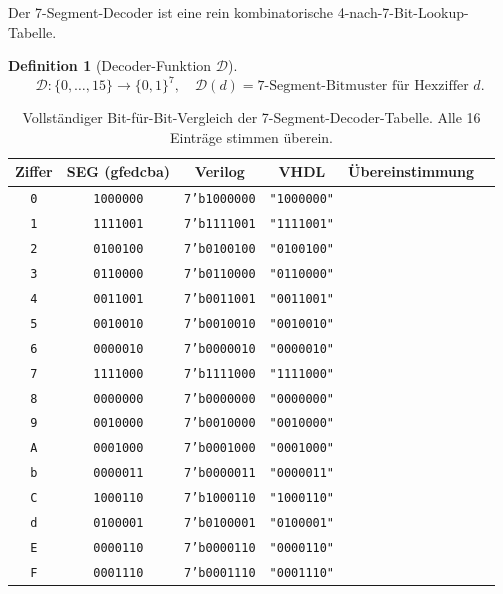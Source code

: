 ﻿\documentclass[12pt,a4paper]{report}
\newtheorem{definition}{Definition}[section]
\begin{document}
Der 7-Segment-Decoder ist eine rein kombinatorische 4-nach-7-Bit-Lookup-Tabelle.

\begin{definition}[Decoder-Funktion $\mathcal{D}$]
	\[
	\mathcal{D} : \{0,\ldots,15\} \to \{0,1\}^7, \quad
	\mathcal{D}(d) = \text{7-Segment-Bitmuster für Hexziffer } d.
	\]
\end{definition}

\begin{table}[H]
	\centering
	\small
	\begin{tabular}{|c|c|c|c|c|c|}
		\hline
		\textbf{Ziffer} & \textbf{SEG (gfedcba)} & \textbf{Verilog} & \textbf{VHDL} & \textbf{Übereinstimmung}\\
		\hline
		\texttt{0} & \texttt{1000000} & \texttt{7'b1000000} & \texttt{"1000000"} & \checkmark \\
		\texttt{1} & \texttt{1111001} & \texttt{7'b1111001} & \texttt{"1111001"} & \checkmark \\
		\texttt{2} & \texttt{0100100} & \texttt{7'b0100100} & \texttt{"0100100"} & \checkmark \\
		\texttt{3} & \texttt{0110000} & \texttt{7'b0110000} & \texttt{"0110000"} & \checkmark \\
		\texttt{4} & \texttt{0011001} & \texttt{7'b0011001} & \texttt{"0011001"} & \checkmark \\
		\texttt{5} & \texttt{0010010} & \texttt{7'b0010010} & \texttt{"0010010"} & \checkmark \\
		\texttt{6} & \texttt{0000010} & \texttt{7'b0000010} & \texttt{"0000010"} & \checkmark \\
		\texttt{7} & \texttt{1111000} & \texttt{7'b1111000} & \texttt{"1111000"} & \checkmark \\
		\texttt{8} & \texttt{0000000} & \texttt{7'b0000000} & \texttt{"0000000"} & \checkmark \\
		\texttt{9} & \texttt{0010000} & \texttt{7'b0010000} & \texttt{"0010000"} & \checkmark \\
		\texttt{A} & \texttt{0001000} & \texttt{7'b0001000} & \texttt{"0001000"} & \checkmark \\
		\texttt{b} & \texttt{0000011} & \texttt{7'b0000011} & \texttt{"0000011"} & \checkmark \\
		\texttt{C} & \texttt{1000110} & \texttt{7'b1000110} & \texttt{"1000110"} & \checkmark \\
		\texttt{d} & \texttt{0100001} & \texttt{7'b0100001} & \texttt{"0100001"} & \checkmark \\
		\texttt{E} & \texttt{0000110} & \texttt{7'b0000110} & \texttt{"0000110"} & \checkmark \\
		\texttt{F} & \texttt{0001110} & \texttt{7'b0001110} & \texttt{"0001110"} & \checkmark \\
		\hline
	\end{tabular}
	\caption{Vollständiger Bit-für-Bit-Vergleich der 7-Segment-Decoder-Tabelle.
		Alle 16 Einträge stimmen überein.}
	\label{tab:seg_decoder}
\end{table}
\end{document}
